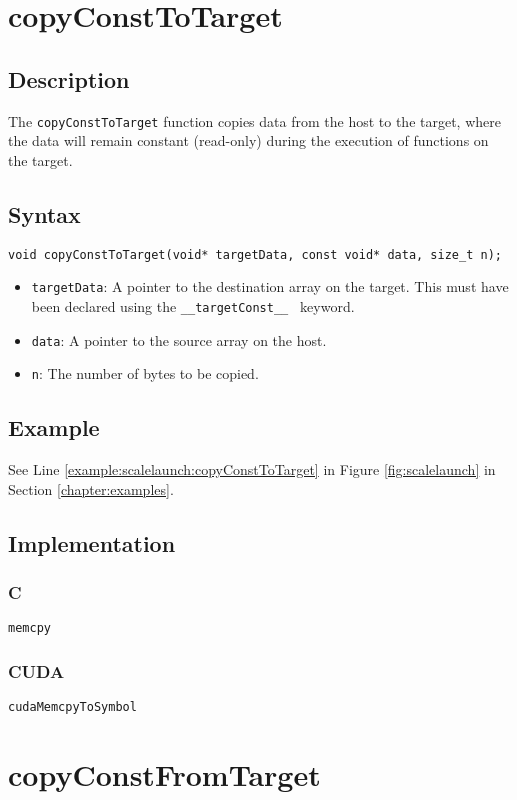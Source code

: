 \newpage
\section{copyConstToTarget}

\subsection{Description}

The \verb+copyConstToTarget+ function copies data from the host to the target, where the data will remain constant (read-only) during the execution of functions on the target.

\subsection{Syntax}
\begin{verbatim}
void copyConstToTarget(void* targetData, const void* data, size_t n);
\end{verbatim}

\begin{itemize}
\item \verb+targetData+: A pointer to the destination array on the target. This must have been declared using the \verb+__targetConst__ + keyword.
\item \verb+data+: A pointer to the source array on the host.
\item \verb+n+: The number of bytes to be copied.
\end{itemize}


\subsection{Example}
See Line \ref{example:scalelaunch:copyConstToTarget} in Figure \ref{fig:scalelaunch} in Section \ref{chapter:examples}.
\subsection{Implementation}
\subsubsection{C}
\verb+memcpy+
\subsubsection{CUDA}
\verb+cudaMemcpyToSymbol+

\newpage
\section{copyConstFromTarget}

